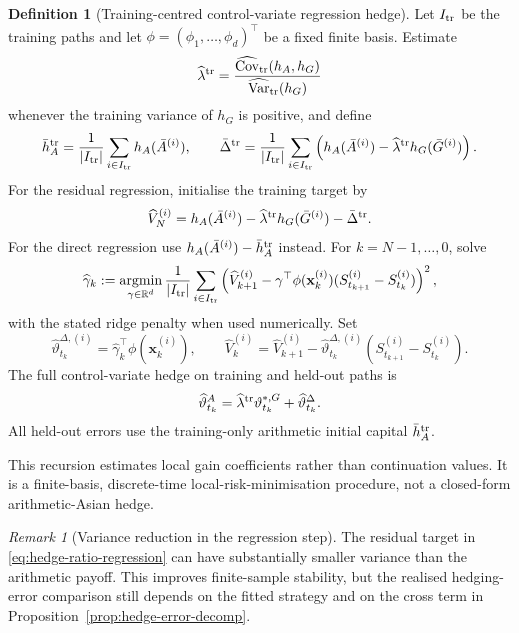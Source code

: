 \documentclass[10pt,a4paper,reqno]{amsart}
\DeclareMathOperator{\argmin}{argmin}
\theoremstyle{plain}
\theoremstyle{definition}
\newtheorem{definition}[theorem]{Definition}
\theoremstyle{remark}
\newtheorem{remark}[theorem]{Remark}
\theoremstyle{example}
\begin{document}
 \begin{definition}[Training-centred control-variate regression hedge]
\label{def:CV-backward-hedge}
Let  \(I_{\rm tr}\) be the  training paths and let
\(\phi=(\phi_1,\ldots,\phi_d)^\top\) be a fixed finite basis.  Estimate
\[
 \widehat\lambda^{\rm tr}
 =\frac{\widehat{\operatorname{Cov}}_{\rm tr}(h_A,h_G)}{\widehat{\operatorname{Var}}_{\rm tr}(h_G)}
\]
 whenever the training variance of \(h_G\) is positive, and define
\[
 \bar h_A^{\rm tr}=\frac{1}{|I_{\rm tr}|}\sum_{i\in I_{\rm tr}}h_A(\bar A^{(i)}),
 \qquad
 \bar\Delta^{\rm tr}=\frac{1}{|I_{\rm tr}|}\sum_{i\in I_{\rm tr}}
 \left(h_A(\bar A^{(i)})-\widehat\lambda^{\rm tr}h_G(\bar G^{(i)})\right).
\]
 For the residual regression, initialise the training target by
\[
 \widehat V_N^{(i)}=h_A(\bar A^{(i)})-
 \widehat\lambda^{\rm tr}h_G(\bar G^{(i)})-\bar\Delta^{\rm tr}.
\]
 For the direct regression use \(h_A(\bar A^{(i)})-\bar h_A^{\rm tr}\) instead.  For
\(k=N-1,\ldots,0\), solve
\begin{align}\label{eq:hedge-ratio-regression}
 \widehat\gamma_k
 :=\argmin_{\gamma\in\mathbb R^d}\frac{1}{|I_{\rm tr}|}
 \sum_{i\in I_{\rm tr}}
 \left(\widehat V_{k+1}^{(i)}-
 \gamma^\top\phi(\mathbf x_k^{(i)})
 (S_{t_{k+1}}^{(i)}-S_{t_k}^{(i)})\right)^2,
\end{align}
 with the stated ridge penalty when used numerically.  Set
\[
 \widehat\vartheta_{t_k}^{\Delta,(i)}
 =\widehat\gamma_k^\top\phi(\mathbf x_k^{(i)}),
 \qquad
 \widehat V_k^{(i)}=\widehat V_{k+1}^{(i)}-
 \widehat\vartheta_{t_k}^{\Delta,(i)}
 (S_{t_{k+1}}^{(i)}-S_{t_k}^{(i)}).
\]
The full control-variate hedge on training and held-out paths is
\begin{align}\label{eq:full-CV-hedge}
 \widehat\vartheta^A_{t_k}
 =\widehat\lambda^{\rm tr}\vartheta^{*,G}_{t_k}
 +\widehat\vartheta^\Delta_{t_k}.
\end{align}
All held-out errors use the training-only arithmetic initial capital
\(\bar h_A^{\rm tr}\).
\end{definition}

 This recursion estimates local gain coefficients rather than continuation values.  It is a
finite-basis, discrete-time local-risk-minimisation procedure, not a closed-form arithmetic-Asian
hedge.

\begin{remark}[Variance reduction in the regression step]
\label{rem:regression-variance-reduction}
The  residual target in \eqref{eq:hedge-ratio-regression}  can have substantially smaller variance
than the arithmetic payoff.  This improves finite-sample stability, but the realised hedging-error
comparison still depends on the fitted strategy and on the cross term in
Proposition~\ref{prop:hedge-error-decomp}.
\end{remark}
\end{document}
